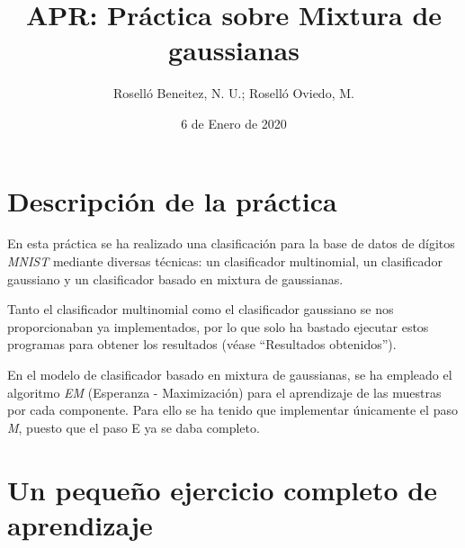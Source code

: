 \documentclass[a4paper]{article}
\begin{document}
\author{Roselló Beneitez, N. U.; Roselló Oviedo, M.}
\title{APR: Práctica sobre Mixtura de gaussianas}
\date{6 de Enero de 2020}
\maketitle{}
\thispagestyle{empty}

\newpage
\tableofcontents
\listoffigures

\newpage
\section{Descripción de la práctica}
\quad En esta práctica se ha realizado una clasificación para la base de datos de dígitos \textit{MNIST} mediante diversas técnicas: un clasificador multinomial, un clasificador gaussiano y un clasificador basado en mixtura de gaussianas.

\quad Tanto el clasificador multinomial como el clasificador gaussiano se nos proporcionaban ya implementados, por lo que solo ha bastado ejecutar estos programas para obtener los resultados (véase “Resultados obtenidos”).

\quad En el modelo de clasificador basado en mixtura de gaussianas, se ha empleado el algoritmo \textit{EM} (Esperanza - Maximización) para el aprendizaje de las muestras por cada componente. Para ello se ha tenido que implementar únicamente el paso \textit{M}, puesto que el paso E ya se daba completo.

\section{Un pequeño ejercicio completo de aprendizaje}
\end{document}
